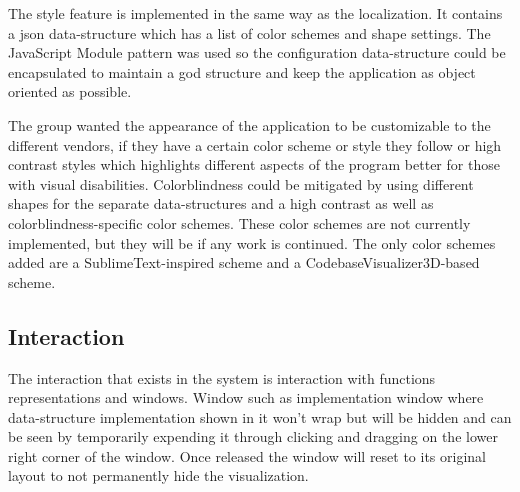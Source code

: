 The style feature is implemented in the same way as the localization. It contains a \gls{json} data-structure which has a list of color schemes and shape settings. The JavaScript Module pattern was used so the configuration data-structure could be encapsulated to maintain a god structure and keep the application as object oriented as possible. 

The group wanted the appearance of the application to be customizable to the different vendors, if they have a certain color scheme or style they follow or high contrast styles which highlights different aspects of the program better for those with visual disabilities. Colorblindness could be mitigated by using different shapes for the separate data-structures and a high contrast as well as colorblindness-specific color schemes. These color schemes are not currently implemented, but they will be if any work is continued. The only color schemes added are a SublimeText-inspired scheme and a CodebaseVisualizer3D-based scheme.


\subsection{Interaction}

The interaction that exists in the system is interaction with functions representations and windows. Window such as implementation window where data-structure implementation shown in it won't wrap but will be hidden and can be seen by temporarily expending it through clicking and dragging on the lower right corner of the window. Once released the window will reset to its original layout to not permanently hide the visualization.

